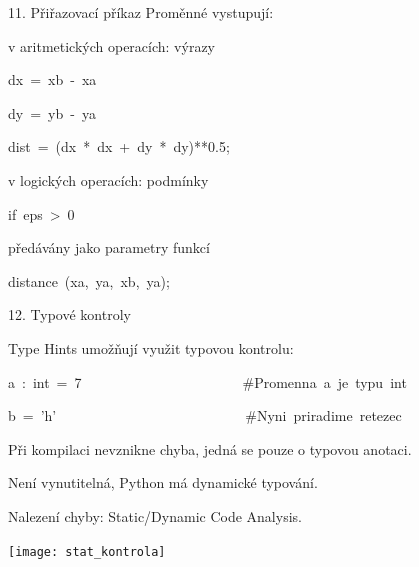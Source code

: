 \documentclass[czech]{beamer}
\newenvironment{lyxcode}
  {\par\begin{list}{}{
    \setlength{\rightmargin}{\leftmargin}
    \setlength{\listparindent}{0pt}%
    \raggedright
    \setlength{\itemsep}{0pt}
    \setlength{\parsep}{0pt}
    \normalfont\ttfamily}%
   \def\{{\char`\{}
   \def\}{\char`\}}
   \def\textasciitilde{\char`\~}
   \item[]}
  {\end{list}}
\begin{document}
\begin{frame}{11. Přiřazovací příkaz}
{\tiny Proměnné vystupují:}{\tiny\par}
\begin{itemize}
\item {\tiny v aritmetických operacích: výrazy}{\tiny\par}
\begin{lyxcode}
{\tiny dx~=~xb~-~xa}{\tiny\par}

{\tiny dy~=~yb~-~ya}{\tiny\par}

{\tiny dist~=~(dx~{*}~dx~+~dy~{*}~dy){*}{*}0.5;}{\tiny\par}
\end{lyxcode}
\item {\tiny v logických operacích: podmínky}{\tiny\par}
\begin{lyxcode}
{\tiny if~eps~>~0}{\tiny\par}
\end{lyxcode}
\item {\tiny předávány jako parametry funkcí}{\tiny\par}
\begin{lyxcode}
{\tiny distance~(xa,~ya,~xb,~ya);}{\tiny\par}
\end{lyxcode}
\end{itemize}
\end{frame}

\begin{frame}[plain]{12. Typové kontroly}

{\tiny Type Hints umožňují využit typovou kontrolu:}{\tiny\par}
\begin{lyxcode}
{\tiny a~:~int~=~7~~~~~~~~~~~~~~~~~~~~~~~\#Promenna~a~je~typu~int}{\tiny\par}

{\tiny b~=~'h'~~~~~~~~~~~~~~~~~~~~~~~~~~~\#Nyni~priradime~retezec}{\tiny\par}
\end{lyxcode}
{\tiny Při kompilaci nevznikne chyba, jedná se pouze o typovou anotaci. }{\tiny\par}

{\tiny Není vynutitelná, Python má dynamické typování.\bigskip{}
}{\tiny\par}

{\tiny Nalezení chyby: Static/Dynamic Code Analysis.}{\tiny\par}
\begin{lyxcode}
\begin{center}
{\tiny\texttt{[image: stat\_kontrola]}}{\tiny\par}
\par\end{center}

\end{lyxcode}
\end{frame}
\end{document}
